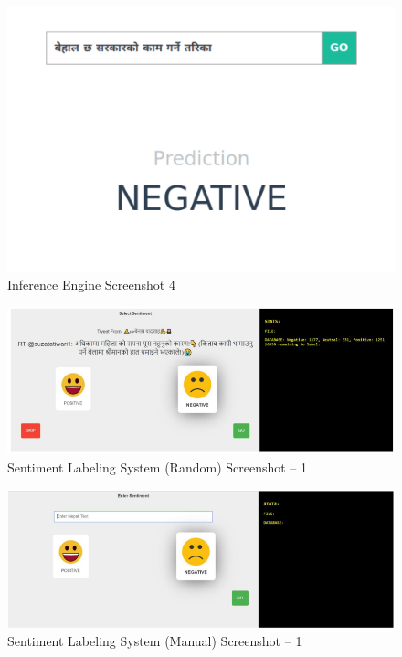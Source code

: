 		\begin{figure}[hbt!]
		    \centering
			    \includegraphics[width=1.0\textwidth]{./img/4.png}
			    \caption{Inference Engine Screenshot 4}
		\end{figure}
		\begin{figure}[hbt!]
		    \centering
			    \includegraphics[width=1.0\textwidth]{./img/5.png}
			    \caption{Sentiment Labeling System (Random) Screenshot – 1}
		\end{figure}
		\begin{figure}[hbt!]
		    \centering
			    \includegraphics[width=1.0\textwidth]{./img/6.png}
			    \caption{Sentiment Labeling System (Manual) Screenshot – 1}
		\end{figure}